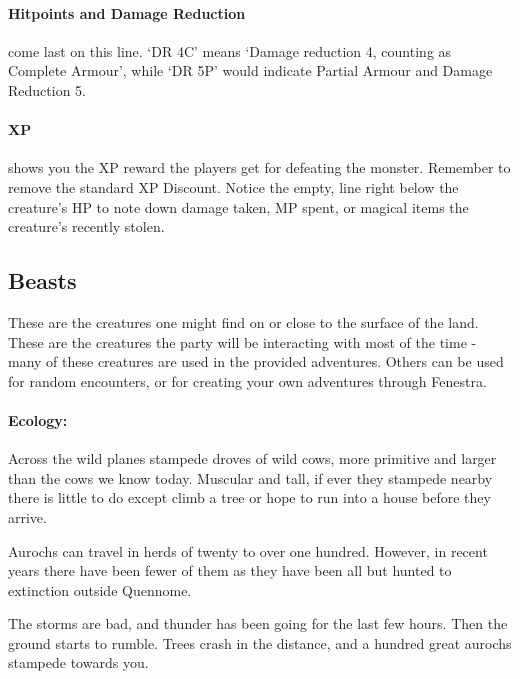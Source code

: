 \begin{multicols}{2}
\paragraph{Hitpoints and Damage Reduction} come last on this line.  `DR 4C' means `Damage reduction 4, counting as Complete Armour', while `DR 5P' would indicate Partial Armour and Damage Reduction 5.

\paragraph{XP} shows you the XP reward the players get for defeating the monster.  Remember to remove the standard XP Discount.  Notice the empty, line right below the creature's HP to note down damage taken, MP spent, or magical items the creature's recently stolen.


\subsection{Beasts}

These are the creatures one might find on or close to the surface of the land.  These are the creatures the party will be interacting with most of the time - many of these creatures are used in the provided adventures.  Others can be used for random encounters, or for creating your own adventures through Fenestra.


\label{auroch}

\auroch

\paragraph{Ecology:} Across the wild planes stampede droves of wild cows, more primitive and larger than the cows we know today.  Muscular and tall, if ever they stampede nearby there is little to do except climb a tree or hope to run into a house before they arrive.

	Aurochs can travel in herds of twenty to over one hundred.  However, in recent years there have been fewer of them as they have been all but hunted to extinction outside Quennome.


\begin{boxtext}

	The storms are bad, and thunder has been going for the last few hours.  Then the ground starts to rumble.  Trees crash in the distance, and a hundred great aurochs stampede towards you.

\end{boxtext}


\end{multicols}
